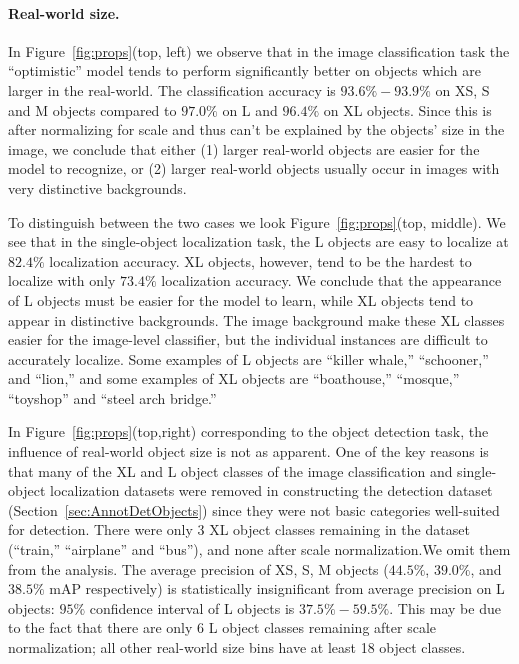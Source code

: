 \paragraph{Real-world size.} In Figure~\ref{fig:props}(top, left) we observe that in the image classification task the ``optimistic'' model tends to perform significantly better on objects which are larger in the real-world.  The classification accuracy is $93.6\%-93.9\%$ on XS, S and M objects compared to $97.0\%$ on L and $96.4\%$ on XL objects. Since this is after normalizing for scale and thus can't be explained by the objects' size in the image, we conclude that either (1) larger real-world objects are easier for the model to recognize, or (2) larger real-world objects usually occur in images with very distinctive backgrounds.

To distinguish between the two cases we look Figure~\ref{fig:props}(top, middle). We see that in the single-object localization task, the L objects are easy to localize at $82.4\%$ localization accuracy. XL objects, however, tend to be the hardest to localize with only $73.4\%$ localization accuracy. We conclude that the appearance of L objects must be easier for the model to learn, while XL objects tend to appear in distinctive backgrounds. The image background make these XL classes easier for the image-level classifier, but the individual instances are difficult to accurately localize. Some examples of L objects are ``killer whale,'' ``schooner,'' and ``lion,'' and some examples of XL objects are ``boathouse,'' ``mosque,'' ``toyshop'' and ``steel arch bridge.''

In Figure~\ref{fig:props}(top,right) corresponding to the object detection task, the influence of real-world object size is not as apparent. One of the key reasons is that many of the XL and L object classes of the image classification and single-object localization datasets were removed in constructing the detection dataset (Section~\ref{sec:AnnotDetObjects}) since they were not basic categories well-suited for detection. There were only 3 XL object classes remaining in the dataset (``train,'' ``airplane'' and ``bus''), and none after scale normalization.We omit them from the analysis. The average precision of XS, S, M objects ($44.5\%$, $39.0\%$, and $38.5\%$ mAP respectively) is statistically insignificant from average precision on L objects: $95\%$ confidence interval of L objects is $37.5\%-59.5\%$. This may be due to the fact that there are only 6 L object classes remaining after scale normalization; all other real-world size bins have at least 18 object classes. 

